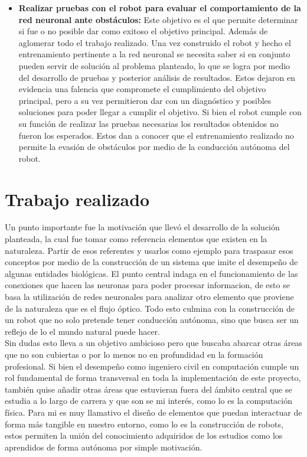 \documentclass{iccmemoria}
\begin{document}
\begin{itemize}
	\item {\bf Realizar pruebas con el robot para evaluar el comportamiento de la red neuronal ante obstáculos:} Este objetivo es el que permite determinar si fue o no posible dar como exitoso el objetivo principal. Además de aglomerar todo el trabajo realizado. Una vez construido el robot y hecho el entrenamiento pertinente a la red neuronal se necesita saber si en conjunto pueden servir de solución al problema planteado, lo que se logra por medio del desarrollo de pruebas y posterior análisis de resultados. Estos dejaron en evidencia una falencia que compromete el cumplimiento del objetivo principal, pero a su vez permitieron dar con un diagnóstico y posibles soluciones para poder llegar a cumplir el objetivo. Si bien el robot cumple con su función de realizar las pruebas necesarias los resultados obtenidos no fueron los esperados. Estos dan a conocer que el entrenamiento realizado no permite la evasión de obstáculos por medio de la conducción autónoma del robot.\\
\end{itemize}

\section{Trabajo realizado}

Un punto importante fue la motivación que llevó el desarrollo de la solución planteada, la cual fue tomar como referencia elementos que existen en la naturaleza. Partir de esos referentes y usarlos como ejemplo para traspasar esos conceptos por medio de la construcción de un sistema que imite el desempeño de algunas entidades biológicas. El punto central indaga en el funcionamiento de las conexiones que hacen las neuronas para poder procesar informacion, de esto se basa la utilización de redes neuronales para analizar otro elemento que proviene de la naturaleza que es el flujo óptico. Todo esto culmina con la construcción de un robot que no solo pretende tener conducción autónoma, sino que busca ser un reflejo de lo el mundo natural puede hacer.\\

Sin dudas esto lleva a un objetivo ambicioso pero que buscaba abarcar otras áreas que no son cubiertas o por lo menos no en profundidad en la formación profesional. Si bien el desempeño como ingeniero civil en computación cumple un rol fundamental de forma transversal en toda la implementación de este proyecto, también quise añadir otras áreas que estuvieran fuera del ámbito central que se estudia a lo largo de carrera y que son se mi interés, como lo es la computación física. Para mi es muy llamativo el diseño de elementos que puedan interactuar de forma más tangible en nuestro entorno, como lo es la construcción de robots, estos permiten la unión del conocimiento adquiridos de los estudios como los aprendidos de forma autónoma por simple motivación.\\
\end{document}

